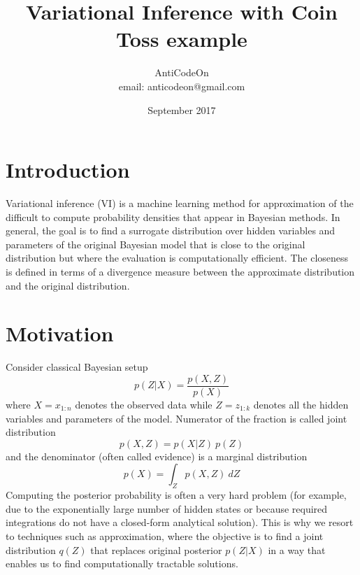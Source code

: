 \documentclass{article}
\title{Variational Inference with Coin Toss example}
\author{AntiCodeOn \\ email: {anticodeon@gmail.com}  }
\date{September 2017}
\begin{document}
\maketitle

\section{Introduction}
Variational inference (VI) is a machine learning method for approximation of the difficult to compute probability densities that appear in Bayesian methods. In general, the goal is to find a surrogate distribution over hidden variables and parameters of the original Bayesian model that is close to the original distribution but where the evaluation is computationally efficient. The closeness is defined in terms of a divergence measure between the approximate distribution and the original distribution. 

\section{Motivation}
Consider classical Bayesian setup 
\begin{equation}\label{BayesEq}
p(Z|X) = \frac{p(X,Z)}{p(X)}
\end{equation}
where $X=x_{1:n}$ denotes the observed data while $Z=z_{1:k}$ denotes all the hidden variables and parameters of the model. Numerator of the fraction is called joint distribution
\begin{equation}
    p(X,Z) = p(X|Z)\:p(Z)
\end{equation}
and the denominator (often called evidence) is a marginal distribution
\begin{equation}
    p(X)=\int_{Z}p(X,Z)\:dZ
\end{equation}
Computing the posterior probability is often a very hard problem (for example, due to the exponentially large number of hidden states or because required integrations do not have a closed-form analytical solution). This is why we resort to techniques such as approximation, where the objective is to find a joint distribution $q(Z)$ that replaces original posterior $p(Z|X)$ in a way that enables us to find computationally tractable solutions.
\end{document}
